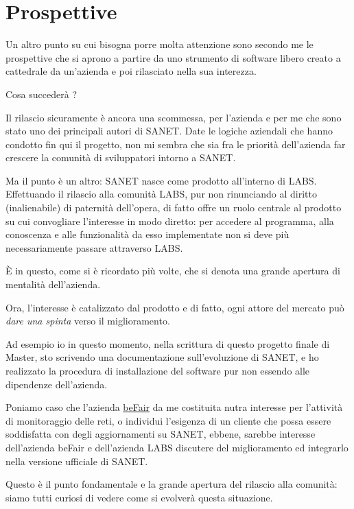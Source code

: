 \documentclass[a4wide,10pt,italian]{manual}
\begin{document}
\section{Prospettive}

Un altro punto su cui bisogna porre molta attenzione sono secondo me le prospettive che
si aprono a partire da uno strumento di software libero creato a cattedrale da un'azienda e poi rilasciato nella sua interezza.

Cosa succederà ?

Il rilascio sicuramente è ancora una scommessa, per l'azienda e per me che sono stato uno dei principali autori di SANET.
Date le logiche aziendali che hanno condotto fin qui il progetto,
non mi sembra che sia fra le priorità dell'azienda far crescere la comunità di sviluppatori intorno a SANET.

Ma il punto è un altro: SANET nasce come prodotto all'interno di LABS. Effettuando il rilascio alla comunità LABS,
pur non rinunciando al diritto (inalienabile) di paternità dell'opera, di fatto offre un ruolo centrale al prodotto
su cui convogliare l'interesse in modo diretto:
per accedere al programma, alla conoscenza e alle funzionalità da esso implementate non si deve più necessariamente
passare attraverso LABS.

È in questo, come si è ricordato più volte, che si denota una grande apertura di mentalità dell'azienda.

Ora, l'interesse è catalizzato dal prodotto e di fatto, ogni attore del mercato può \emph{dare una spinta} verso il miglioramento.

Ad esempio io in questo momento, nella scrittura di questo progetto finale di Master, sto scrivendo una documentazione
sull'evoluzione di SANET, e ho realizzato la procedura di installazione del software pur non essendo alle
dipendenze dell'azienda.

Poniamo caso che l'azienda \href{http://www.befair.it}{beFair} da me costituita nutra interesse per l'attività di monitoraggio delle reti,
o individui l'esigenza di un cliente che possa essere soddisfatta con degli aggiornamenti su SANET, ebbene, sarebbe interesse
dell'azienda beFair e dell'azienda LABS discutere del miglioramento ed integrarlo nella versione ufficiale di SANET.

Questo è il punto fondamentale e la grande apertura del rilascio alla comunità: siamo tutti curiosi di vedere
come si evolverà questa situazione.

\resetcurrentobjects
\hypertarget{--doc-appendix/oss-nms}{}
\end{document}
